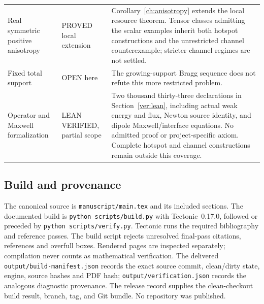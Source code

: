 \begin{longtable}{@{}p{}p{}p{}@{}}
Real symmetric positive anisotropy & PROVED local extension & Corollary~\ref{ch:anisotropy} extends the local resource theorem. Tensor classes admitting the scalar examples inherit both hotspot constructions and the unrestricted channel counterexample; stricter channel regimes are not settled.\\[3pt]
Fixed total support & OPEN here & The growing-support Bragg sequence does not refute this more restricted problem.\\
Operator and Maxwell formalization & LEAN VERIFIED, partial scope & Two thousand thirty-three declarations in Section~\ref{ver:lean}, including actual weak energy and flux, Newton source identity, and dipole Maxwell/interface equations. No admitted proof or project-specific axiom. Complete hotspot and channel constructions remain outside this coverage.\\
\bottomrule
\end{longtable}

\subsection{Build and provenance}
The canonical source is \texttt{manuscript/main.tex} and its included
sections. The documented build is \texttt{python scripts/build.py}
with Tectonic~0.17.0, followed or preceded by
\texttt{python scripts/verify.py}. Tectonic runs the required bibliography
and reference passes. The build script rejects unresolved final-pass
citations, references and overfull boxes. Rendered pages are inspected
separately; compilation never counts as mathematical verification.
The delivered \texttt{output/build-manifest.json} records the exact
source commit, clean/dirty state, engine, source hashes and PDF hash;
\texttt{output/verification.json} records the analogous diagnostic
provenance. The release record supplies the clean-checkout build result,
branch, tag, and Git bundle. No repository was published.
